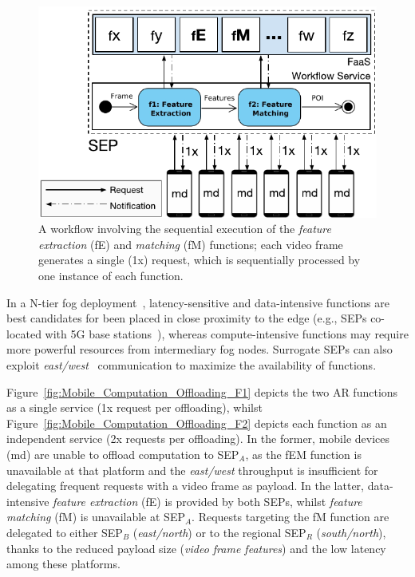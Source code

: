 \begin{figure}[bp]
	\centering
	\includegraphics[width=1\linewidth]{Figs/Mobile_Computation_Offloading_Workflow.pdf}
	\caption{A workflow involving the sequential execution of the \textit{feature extraction} (fE) and \textit{matching} (fM) functions; each video frame generates a single (1x) request, which is sequentially processed by one instance of each function.} 
	\label{fig:Mobile_Computation_Offloading_Workflow}
\end{figure}

In a N-tier fog deployment~\cite{OpenFog:RA:2017}, latency-sensitive and data-intensive functions are best candidates for been placed in close proximity to the edge (e.g., SEPs co-located with 5G base stations~\cite{ETSI:MEC:2016:03}), whereas compute-intensive functions may require more powerful resources from intermediary fog nodes. Surrogate SEPs can also exploit \textit{east/west}~\cite{OpenFog:RA:2017} communication to maximize the availability of functions.

Figure~\ref{fig:Mobile_Computation_Offloading_F1} depicts the two AR functions as a single service (1x request per offloading), whilst Figure~\ref{fig:Mobile_Computation_Offloading_F2} depicts each function as an independent service (2x requests per offloading). In the former, mobile devices (md) are unable to offload computation to SEP$_A$, as the fEM function is unavailable at that platform and the \textit{east/west} throughput is insufficient for delegating frequent requests with a video frame as payload. In the latter, data-intensive \textit{feature extraction} (fE) is provided by both SEPs, whilst \textit{feature matching} (fM) is unavailable at SEP$_A$. Requests targeting the fM function are delegated
to either SEP$_B$ (\textit{east/north}) or 
to the regional SEP$_R$ (\textit{south/north}),
thanks to the reduced payload size (\textit{video frame features}) and the low latency among these platforms. 



